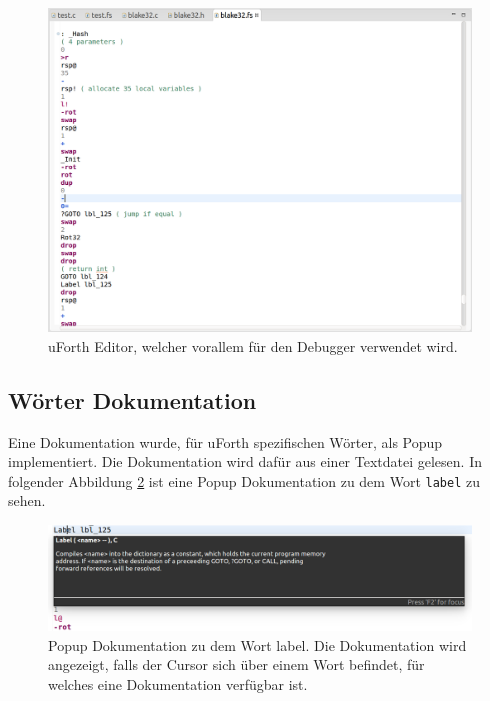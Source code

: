 \begin{figure}[H]
	\centering
		\includegraphics[scale=0.4]{fortheditor/fortheditor.png}
		\caption{uForth Editor, welcher vorallem für den Debugger verwendet wird.}
		\label{fig:fortheditor}
\end{figure}

\newpage

\subsection{Wörter Dokumentation}
Eine Dokumentation wurde, für uForth spezifischen Wörter, als Popup implementiert. Die Dokumentation wird dafür aus einer Textdatei gelesen. In folgender Abbildung \ref{fig:docpopup} ist eine Popup Dokumentation zu dem Wort \verb!label! zu sehen.

\begin{figure}[H]
	\centering
		\includegraphics[scale=0.4]{fortheditor/doc.png}
		\caption{Popup Dokumentation zu dem Wort label. Die Dokumentation wird angezeigt, falls der Cursor sich über einem Wort befindet, für welches eine Dokumentation verfügbar ist.}
		\label{fig:docpopup}
\end{figure}

